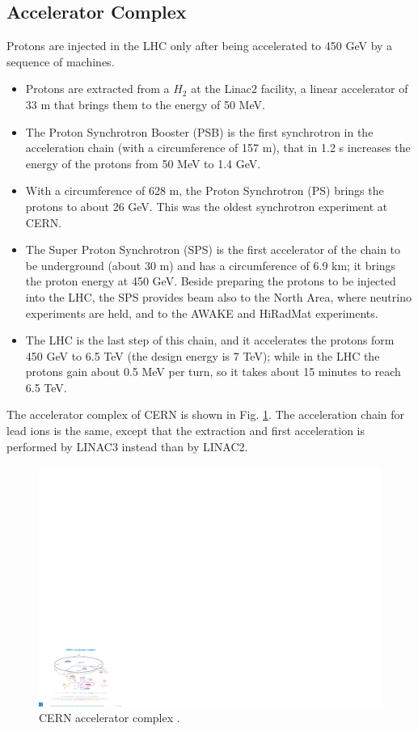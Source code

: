 \subsection{Accelerator Complex}

Protons are injected in the LHC only after being accelerated to 450 GeV by a sequence of machines.

\begin{itemize}
\item Protons are extracted from a $H_2$ at the Linac2 facility, a linear accelerator of 33 m that brings them to the energy of 50 MeV.
\item The Proton Synchrotron Booster (PSB) is the first synchrotron in the acceleration chain (with a circumference of 157 m), that in 1.2 s increases the energy of the protons from 50 MeV to 1.4 GeV.
\item With a circumference of 628 m, the Proton Synchrotron (PS) brings the protons to about 26 GeV. This was the oldest synchrotron experiment at CERN.
\item The Super Proton Synchrotron (SPS) is the first accelerator of the chain to be underground (about 30 m) and has a circumference of 6.9 km; it brings the proton energy at 450 GeV. Beside preparing the protons to be injected into the LHC, the SPS provides beam also to the North Area, where neutrino experiments are held, and to the AWAKE and HiRadMat experiments.
\item The LHC is the last step of this chain, and it accelerates the protons form 450 GeV to 6.5 TeV (the design energy is 7 TeV); while in the LHC the protons gain about 0.5 MeV per turn, so it takes about 15 minutes to reach 6.5 TeV.
\end{itemize}

The accelerator complex of CERN is shown in Fig. \ref{fig:lhc:acc}. The acceleration chain for lead ions is the same, except that the extraction and first acceleration is performed by LINAC3 instead than by LINAC2.

\begin{figure}[ht]
\centering
\includegraphics[width=1\textwidth]{figures/lhc/acc_complex.pdf}
\caption{CERN accelerator complex \cite{Christiane:1260465}.}
\label{fig:lhc:acc}
\end{figure}

